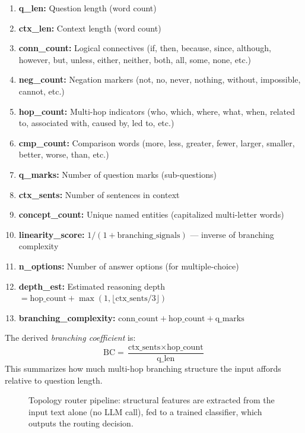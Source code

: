 \begin{enumerate}
\item \textbf{q\_len:} Question length (word count)
\item \textbf{ctx\_len:} Context length (word count)
\item \textbf{conn\_count:} Logical connectives (if, then, because, since, although, however, but, unless, either, neither, both, all, some, none, etc.)
\item \textbf{neg\_count:} Negation markers (not, no, never, nothing, without, impossible, cannot, etc.)
\item \textbf{hop\_count:} Multi-hop indicators (who, which, where, what, when, related to, associated with, caused by, led to, etc.)
\item \textbf{cmp\_count:} Comparison words (more, less, greater, fewer, larger, smaller, better, worse, than, etc.)
\item \textbf{q\_marks:} Number of question marks (sub-questions)
\item \textbf{ctx\_sents:} Number of sentences in context
\item \textbf{concept\_count:} Unique named entities (capitalized multi-letter words)
\item \textbf{linearity\_score:} $1 / (1 + \text{branching\_signals})$ --- inverse of branching complexity
\item \textbf{n\_options:} Number of answer options (for multiple-choice)
\item \textbf{depth\_est:} Estimated reasoning depth $= \text{hop\_count} + \max(1, \lfloor\text{ctx\_sents}/3\rfloor)$
\item \textbf{branching\_complexity:} $\text{conn\_count} + \text{hop\_count} + \text{q\_marks}$
\end{enumerate}

The derived \emph{branching coefficient} is:
\begin{equation}
\text{BC} = \frac{\text{ctx\_sents} \times \text{hop\_count}}{\text{q\_len}}
\end{equation}
This summarizes how much multi-hop branching structure the input affords relative to question length.

\begin{figure}[ht]
\centering
{}
\caption{Topology router pipeline: structural features are extracted from the input text alone (no LLM call), fed to a trained classifier, which outputs the routing decision.}
\label{fig:router_pipeline}
\end{figure}

